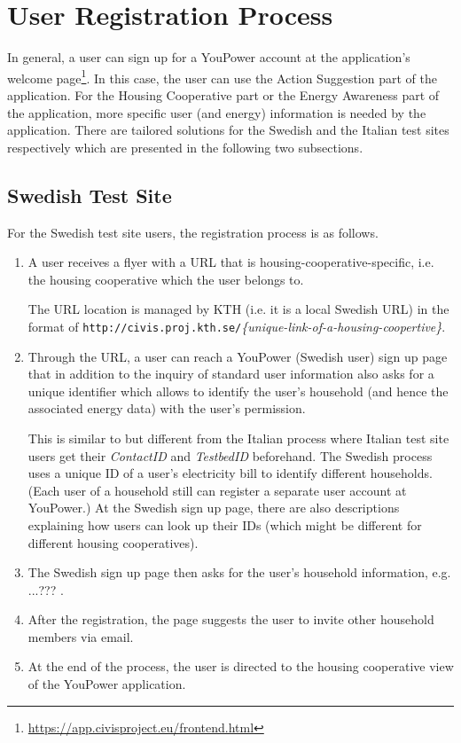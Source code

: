 \section{User Registration Process}
\label{sec:reg}

In general, a user can sign up for a YouPower account at the application's welcome page\footnote{\url{https://app.civisproject.eu/frontend.html}}. In this case, the user can use the Action Suggestion part of the application. For the Housing Cooperative part or the Energy Awareness part of the application, more specific user (and energy) information is needed by the application. There are tailored solutions for the Swedish and the Italian test sites respectively which are presented in the following two subsections. 

\subsection{Swedish Test Site}

For the Swedish test site users, the registration process is as follows. 

\begin{enumerate}
\item A user receives a flyer with a URL that is housing-cooperative-specific, i.e. the housing cooperative which the user belongs to. 

The URL location is managed by KTH (i.e. it is a local Swedish URL) in the format of  \texttt{\small http://civis.proj.kth.se/}\textit{\{unique-link-of-a-housing-coopertive\}}. 

\item Through the URL, a user can reach a YouPower (Swedish user) sign up page that in addition to the inquiry of standard user information also asks for a unique identifier which allows to identify the user's household (and hence the associated energy data) with the user's permission. 

This is similar to but different from the Italian process where Italian test site users get their \textit{ContactID} and \textit{TestbedID} beforehand. The Swedish process uses a unique ID of a user's electricity bill to identify different households. (Each user of a household still can register a separate user account at YouPower.) At the Swedish sign up page, there are also descriptions explaining how users can look up their IDs (which might be different for different housing cooperatives). 

\item The Swedish sign up page then asks for the user's household information, e.g. ...??? . 

\item After the registration, the page suggests the user to invite other household members via email.

\item At the end of the process, the user is directed to the housing cooperative view of the YouPower application. 

\end{enumerate}

